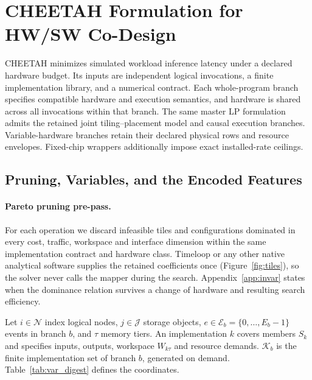 \section{CHEETAH Formulation for HW/SW Co-Design}
\label{sec:methods}
CHEETAH minimizes simulated workload inference latency under a declared hardware budget.
Its inputs are independent logical invocations, a finite implementation library, and a numerical contract.
Each whole-program branch specifies compatible hardware and execution semantics, and hardware is shared across all invocations within that branch.
The same master LP formulation admits the retained joint tiling--placement model and causal execution branches.
Variable-hardware branches retain their declared physical rows and resource envelopes.
Fixed-chip wrappers additionally impose exact installed-rate ceilings.

\subsection{Pruning, Variables, and the Encoded Features}
\label{sec:v1}\label{sec:master_lp}\label{sec:v3}
\paragraph{Pareto pruning pre-pass.}
For each operation we discard infeasible tiles and configurations dominated in every cost, traffic, workspace and interface dimension within the same implementation contract and hardware class.
Timeloop or any other native analytical software supplies the retained coefficients once (Figure~\ref{fig:tiles}), so the solver never calls the mapper during the search.
Appendix~\ref{app:invar} states when the dominance relation survives a change of hardware and resulting search efficiency.

Let $i\in\mathcal N$ index logical nodes, $j\in\mathcal J$ storage objects, $e\in\mathcal E_b=\{0,\ldots,E_b-1\}$ events in branch $b$, and $\tau$ memory tiers.
An implementation $k$ covers members $S_k$ and specifies inputs, outputs, workspace $W_{k\tau}$ and resource demands.
$\mathcal K_b$ is the finite implementation set of branch $b$, generated on demand.
Table~\ref{tab:var_digest} defines the coordinates.

